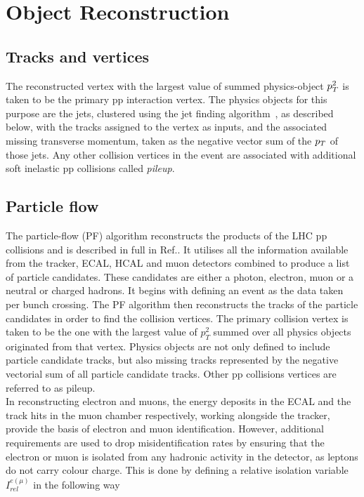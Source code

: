 \chapter{Object Reconstruction}
\label{sec:tau_identification}

\section{Tracks and vertices}

The reconstructed vertex with the largest value of summed physics-object $p_{T}^{2}$ is taken to be the primary pp interaction vertex. 
The physics objects for this purpose are the jets, clustered using the jet finding algorithm~\cite{Cacciari:2008gp,Cacciari:2011ma}, as described below, with the tracks assigned to the vertex as inputs, and the
associated missing transverse momentum, taken as the negative vector sum of the $p_{T}$ of those jets.
Any other collision vertices in the event are associated with additional soft inelastic pp collisions called \emph{pileup}.

\section{Particle flow}

The particle-flow (PF) algorithm reconstructs the products of the LHC pp collisions and is described in full in Ref.\cite{PF_CMS}.  
It utilises all the information available from the tracker, ECAL, HCAL and muon detectors combined to produce a list of particle candidates. 
These candidates are either a photon, electron, muon or a neutral or charged hadrons. It begins with defining an event as the data taken per bunch crossing. 
The PF algorithm then reconstructs the tracks of the particle candidates in order to find the collision vertices. 
The primary collision vertex is taken to be the one with the largest value of \(p_T^{2}\) summed over all physics objects originated from that vertex. 
Physics objects are not only defined to include particle candidate tracks, but also missing tracks represented by the negative vectorial sum of all particle candidate tracks. Other pp collisions vertices are referred to as pileup. \\

In reconstructing electron and muons, the energy deposits in the ECAL and the track hits in the muon chamber respectively, working alongside the tracker, provide the basis of electron and muon identification. However, additional requirements are used to drop misidentification rates by ensuring that the electron or muon is isolated from any hadronic activity in the detector, as leptons do not carry colour charge. This is done by defining a relative isolation variable \(I_{rel}^{e(\mu)}\) in the following way

